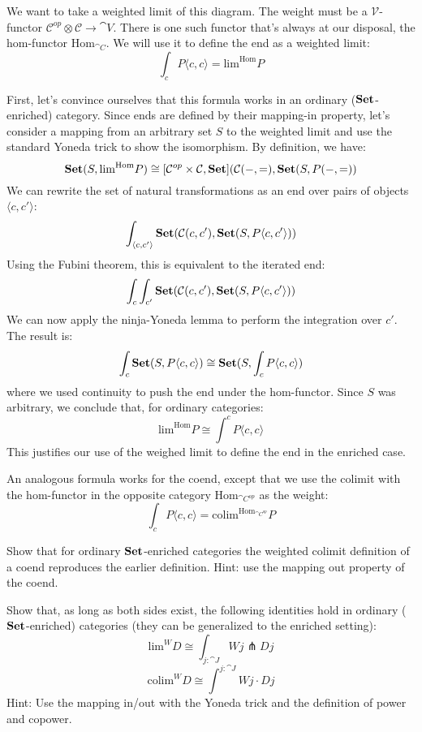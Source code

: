 \documentclass[DaoFP]{subfiles}
\begin{document}
We want to take a weighted limit of this diagram. The weight must be a $\mathcal V$-functor $\mathcal C^{op} \otimes \mathcal C \to \cat V$. There is one such functor that's always at our disposal, the hom-functor $\text{Hom}_{\cat C}$. We will use it to define the end as a weighted limit:
\[  \int_c P\langle c, c\rangle = \text{lim}^{\text{Hom}} P\]

First, let's convince ourselves that this formula works in an ordinary ($\mathbf{Set}$-enriched) category. Since ends are defined by their mapping-in property, let's consider a mapping from an arbitrary set $S$ to the weighted limit and use the standard Yoneda trick to show the isomorphism. By definition, we have:
\[ \mathbf{Set}(S, \text{lim}^{\text{Hom}} P) \cong [\mathcal{C}^{op} \times \mathcal{C}, \mathbf{Set}](\mathcal{C}(-, =), \mathbf{Set} (S, P(-, =))\]
We can rewrite the set of natural transformations as an end over pairs of objects $\langle c, c' \rangle$:
\[ \int_{\langle c, c' \rangle} \mathbf{Set}(\mathcal{C}(c, c'), \mathbf{Set}(S, P\langle c, c' \rangle)) \]
Using the Fubini theorem, this is equivalent to the iterated end:
\[\int_c \int_{c'} \mathbf{Set}(\mathcal{C}(c, c'), \mathbf{Set}(S, P\langle c, c' \rangle))\]
We can now apply the ninja-Yoneda lemma to perform the integration over $c'$. The result is:
\[ \int_c \mathbf{Set}(S, P\langle c, c \rangle) \cong \mathbf{Set}(S, \int_c P \langle c, c \rangle) \]
where we used continuity to push the end under the hom-functor. Since $S$ was arbitrary, we conclude that, for ordinary categories:
\[ \text{lim}^{\text{Hom}} P \cong  \int^c P\langle c, c\rangle \]
This justifies our use of the weighed limit to define the end in the enriched case.

An analogous formula works for the coend, except that we use the colimit with the hom-functor in the opposite category $\text{Hom}_{\cat C^{op}}$ as the weight:
\[  \int_c P\langle c, c\rangle = \text{colim}^{\text{Hom}_{\cat C^{op}}} P\]

\begin{exercise}
Show that for ordinary $\mathbf{Set}$-enriched categories the weighted colimit definition of a coend reproduces the earlier definition. Hint: use the mapping out property of the coend.
\end{exercise}

\begin{exercise}
Show that, as long as both sides exist, the following identities hold in ordinary ($\mathbf{Set}$-enriched) categories (they can be generalized to the enriched setting):
\[ \text{lim}^W D \cong \int_{j \colon \cat J} W j \pitchfork D j \]
\[ \text{colim}^W D \cong \int^{j \colon \cat J} W j \cdot D j \]
Hint: Use the mapping in/out with the Yoneda trick and the definition of power and copower.
\end{exercise}
\end{document}
